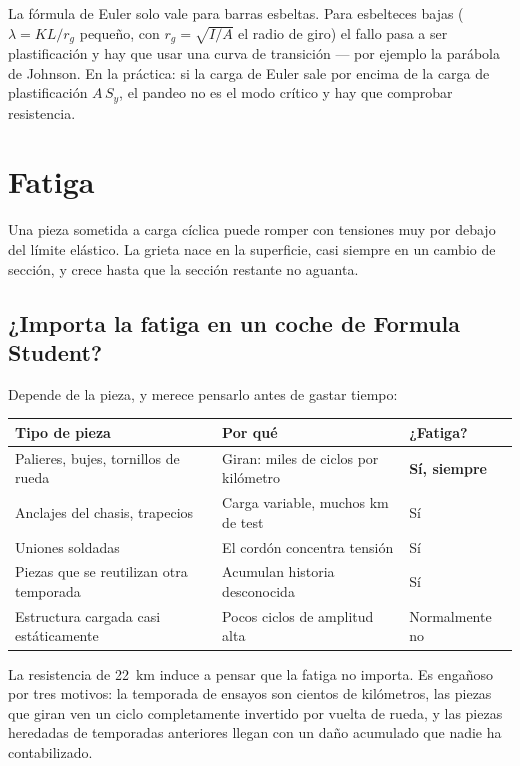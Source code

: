 La fórmula de Euler solo vale para barras esbeltas. Para esbelteces bajas
($\lambda = KL/r_g$ pequeño, con $r_g=\sqrt{I/A}$ el radio de giro) el fallo pasa
a ser plastificación y hay que usar una curva de transición --- por ejemplo la
parábola de Johnson. En la práctica: si la carga de Euler sale por encima de la
carga de plastificación $A\,S_y$, el pandeo no es el modo crítico y hay que
comprobar resistencia.

\section{Fatiga}
\label{sec:mecanica_aplicada:03}

Una pieza sometida a carga cíclica puede romper con tensiones muy por debajo del
límite elástico. La grieta nace en la superficie, casi siempre en un cambio de
sección, y crece hasta que la sección restante no aguanta.

\subsection{¿Importa la fatiga en un coche de Formula Student?}

Depende de la pieza, y merece pensarlo antes de gastar tiempo:

\begin{center}
\begin{tabularx}{\textwidth}{@{}lXl@{}}
\toprule
\textbf{Tipo de pieza} & \textbf{Por qué} & \textbf{¿Fatiga?} \\
\midrule
Palieres, bujes, tornillos de rueda & Giran: miles de ciclos por kilómetro & \textbf{Sí, siempre} \\
Anclajes del chasis, trapecios & Carga variable, muchos km de test & Sí \\
Uniones soldadas & El cordón concentra tensión & Sí \\
Piezas que se reutilizan otra temporada & Acumulan historia desconocida & Sí \\
Estructura cargada casi estáticamente & Pocos ciclos de amplitud alta & Normalmente no \\
\bottomrule
\end{tabularx}
\end{center}

La resistencia de \SI{22}{\kilo\meter} induce a pensar que la fatiga no importa.
Es engañoso por tres motivos: la temporada de ensayos son cientos de kilómetros,
las piezas que giran ven un ciclo completamente invertido por vuelta de rueda, y
las piezas heredadas de temporadas anteriores llegan con un daño acumulado que
nadie ha contabilizado.

